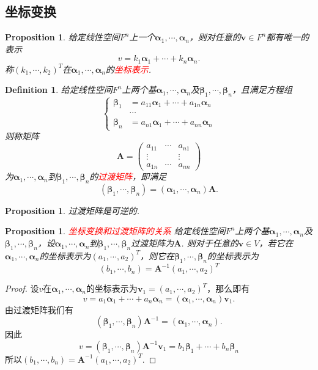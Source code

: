 \documentclass{article}
\newtheorem{proposition}[theorem]{Proposition}
\newtheorem{definition}[theorem]{Definition}
\newcommand{\mbf}[1]{\bm{#1}}
\newcommand{\redt}[1]{\textcolor{red}{#1}}
\begin{document}
\subsection{坐标变换}

\begin{proposition}
\rm 给定线性空间$F^n$上一个$\mbf{\alpha}_1,\cdots,\mbf{\alpha}_n$，则对任意的$\mbf{v} \in F^n$都有唯一的表示
$$
v = k_1\mbf{\alpha}_1+\cdots+k_n\mbf{\alpha}_n.
$$
称$(k_1,\cdots,k_2)^T$在$\mbf{\alpha}_1,\cdots,\mbf{\alpha}_n$的\redt{坐标表示}. 
\end{proposition}

\begin{definition}
\rm 给定线性空间$F^n$上两个基$\mbf{\alpha}_1,\cdots,\mbf{\alpha}_n$及$\mbf{\beta}_1,\cdots,\mbf{\beta}_n$，且满足方程组
$$
\left\{
\begin{array}{rl}
\mbf{\beta}_1  &= a_{11}\mbf{\alpha}_1 + \cdots + a_{1n}\mbf{\alpha}_n \\
&\cdots  \\
\mbf{\beta}_n  &= a_{n1}\mbf{\alpha}_1 + \cdots + a_{nn}\mbf{\alpha}_n
\end{array} \right.
$$
则称矩阵
$$
\mbf{A}=
\begin{pmatrix}
a_{11} & \cdots & a_{n1}\\
\vdots & & \vdots \\
a_{1n} & \cdots & a_{nn}
\end{pmatrix}
$$
为$\mbf{\alpha}_1,\cdots,\mbf{\alpha}_n$到$\mbf{\beta}_1,\cdots,\mbf{\beta}_n$的\redt{过渡矩阵}，即满足
$$
(\mbf{\beta}_1,\cdots,\mbf{\beta}_n) = (\mbf{\alpha}_1,\cdots,\mbf{\alpha}_n)\mbf{A}. 
$$
\end{definition}

\begin{proposition}
\rm 过渡矩阵是可逆的. 
\end{proposition}

\begin{proposition}
\rm \redt{坐标变换和过渡矩阵的关系} 给定线性空间$F^n$上两个基$\mbf{\alpha}_1,\cdots,\mbf{\alpha}_n$及$\mbf{\beta}_1,\cdots,\mbf{\beta}_n$，设$\mbf{\alpha}_1,\cdots,\mbf{\alpha}_n$到$\mbf{\beta}_1,\cdots,\mbf{\beta}_n$过渡矩阵为$\mbf{A}$. 则对于任意的$\mbf{v} \in V$，若它在$\mbf{\alpha}_1,\cdots,\mbf{\alpha}_n$的坐标表示为$(a_1,\cdots,a_2)^T$，则它在$\mbf{\beta}_1,\cdots,\mbf{\beta}_n$的坐标表示为
$$
(b_1,\cdots,b_n) = \mbf{A}^{-1}(a_1,\cdots,a_2)^T
$$
\end{proposition}

\begin{proof}
设$v$在$\mbf{\alpha}_1,\cdots,\mbf{\alpha}_n$的坐标表示为$\mbf{v}_{1}  = (a_1,\cdots,a_2)^T$，那么即有
$$
v = a_1\mbf{\alpha}_1 + \cdots + a_n\mbf{\alpha}_n = (\mbf{\alpha}_1,\cdots,\mbf{\alpha}_n)\mbf{v}_1. 
$$
由过渡矩阵我们有
$$
(\mbf{\beta}_1,\cdots,\mbf{\beta}_n)\mbf{A}^{-1} = (\mbf{\alpha}_1,\cdots,\mbf{\alpha}_n).
$$
因此
$$
v = (\mbf{\beta}_1,\cdots,\mbf{\beta}_n)\mbf{A}^{-1}\mbf{v}_1 = b_1\mbf{\beta}_1 + \cdots + b_n\mbf{\beta}_n 
$$
所以$(b_1,\cdots,b_n) = \mbf{A}^{-1}(a_1,\cdots,a_2)^T$. 
\end{proof}
\end{document}
